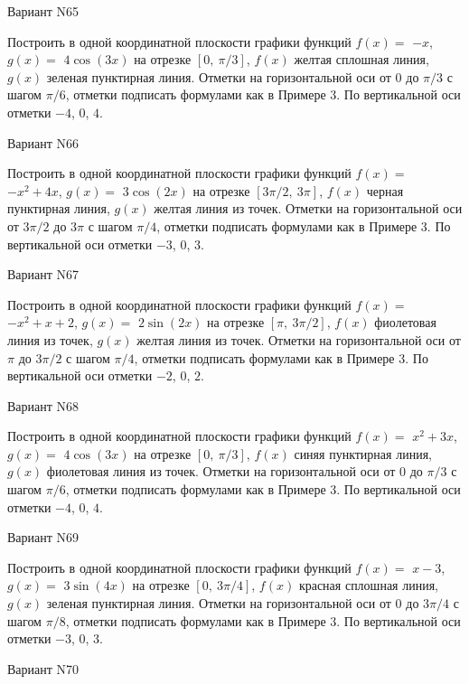 \documentclass[11pt]{report}
\begin{document}
Вариант N65

Построить в одной координатной плоскости графики функций $f(x) = $
    $- x$, $g(x) = $
    $4 \cos{\left(3 x \right)}$ на 
    отрезке $\left[ 0, \  \pi / 3\right]$, $f(x)$ желтая 
    сплошная линия, $g(x)$ зеленая пунктирная линия. 
    Отметки на горизонтальной оси от $0$ до $\pi / 3$ с 
    шагом $\pi / 6$, отметки подписать формулами как в Примере 3.  
    По вертикальной оси отметки $-4$, 0, $4$.

Вариант N66

Построить в одной координатной плоскости графики функций $f(x) = $
    $- x^{2} + 4 x$, $g(x) = $
    $3 \cos{\left(2 x \right)}$ на 
    отрезке $\left[ 3 \pi / 2, \  3 \pi\right]$, $f(x)$ черная 
    пунктирная линия, $g(x)$ желтая линия из точек. 
    Отметки на горизонтальной оси от $3 \pi / 2$ до $3 \pi$ с 
    шагом $\pi / 4$, отметки подписать формулами как в Примере 3.  
    По вертикальной оси отметки $-3$, 0, $3$.

Вариант N67

Построить в одной координатной плоскости графики функций $f(x) = $
    $- x^{2} + x + 2$, $g(x) = $
    $2 \sin{\left(2 x \right)}$ на 
    отрезке $\left[ \pi, \  3 \pi / 2\right]$, $f(x)$ фиолетовая 
    линия из точек, $g(x)$ желтая линия из точек. 
    Отметки на горизонтальной оси от $\pi$ до $3 \pi / 2$ с 
    шагом $\pi / 4$, отметки подписать формулами как в Примере 3.  
    По вертикальной оси отметки $-2$, 0, $2$.

Вариант N68

Построить в одной координатной плоскости графики функций $f(x) = $
    $x^{2} + 3 x$, $g(x) = $
    $4 \cos{\left(3 x \right)}$ на 
    отрезке $\left[ 0, \  \pi / 3\right]$, $f(x)$ синяя 
    пунктирная линия, $g(x)$ фиолетовая линия из точек. 
    Отметки на горизонтальной оси от $0$ до $\pi / 3$ с 
    шагом $\pi / 6$, отметки подписать формулами как в Примере 3.  
    По вертикальной оси отметки $-4$, 0, $4$.

Вариант N69

Построить в одной координатной плоскости графики функций $f(x) = $
    $x - 3$, $g(x) = $
    $3 \sin{\left(4 x \right)}$ на 
    отрезке $\left[ 0, \  3 \pi / 4\right]$, $f(x)$ красная 
    сплошная линия, $g(x)$ зеленая пунктирная линия. 
    Отметки на горизонтальной оси от $0$ до $3 \pi / 4$ с 
    шагом $\pi / 8$, отметки подписать формулами как в Примере 3.  
    По вертикальной оси отметки $-3$, 0, $3$.

Вариант N70
\end{document}
